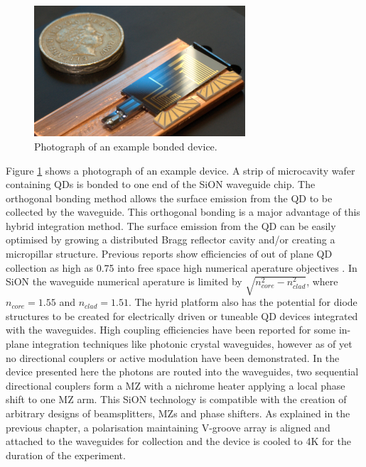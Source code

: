 \begin{figure}[h!] \begin{center}
\includegraphics[width=0.7\textwidth]{images/h2.jpg} \caption{Photograph of an
example bonded device.} \label{fig:photo} \end{center} \end{figure}

Figure \ref{fig:photo} shows a photograph of an example device. A strip of
microcavity wafer containing QDs is bonded to one end of the SiON waveguide
chip. The orthogonal bonding method allows the surface emission from the QD to
be collected by the waveguide. This orthogonal bonding is a major advantage of
this hybrid integration method. The surface emission from the QD can be easily
optimised by growing a distributed Bragg reflector cavity and/or creating a
micropillar structure. Previous reports show efficiencies of out of plane QD
collection as high as 0.75 into free space high numerical aperature objectives
\cite{claudon2010highly, munsch2013dielectric}. In SiON the waveguide numerical
aperature is limited by $\sqrt{n_{core}^2 - n_{clad}^2}$, where $n_{core} =
\mathrm{1.55}$ and $n_{clad} = \mathrm{1.51}$. The hyrid platform also has the
potential for diode structures to be created for electrically driven or tuneable
QD devices integrated with the waveguides. High coupling efficiencies have been
reported for some in-plane integration techniques like photonic crystal
waveguides\cite{schwagmann2011chip, arcari2014near}, however as of yet no
directional couplers or active modulation have been demonstrated. In the device
presented here the photons are routed into the waveguides, two sequential
directional couplers form a MZ with a nichrome heater applying a local phase
shift to one MZ arm. This SiON technology is compatible with the creation of
arbitrary designs of beamsplitters, MZs and phase shifters. As explained in the
previous chapter, a polarisation maintaining V-groove array is aligned and
attached to the waveguides for collection and the device is cooled to 4K for the
duration of the experiment.

